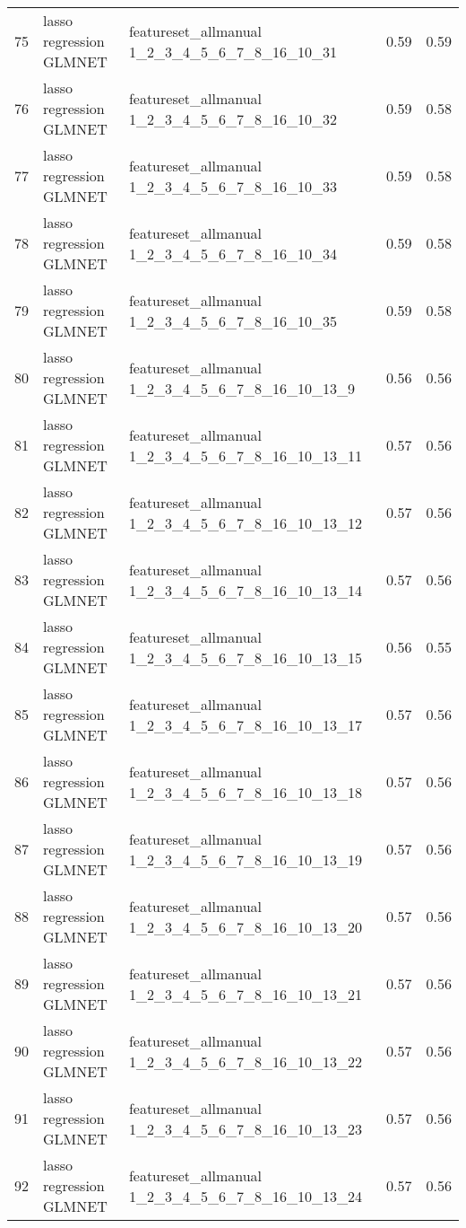 \begin{tabular}{cllcc}
  75 & lasso regression GLMNET & featureset\_allmanual 1\_2\_3\_4\_5\_6\_7\_8\_16\_10\_31 & 0.59 & 0.59 \\ 
  76 & lasso regression GLMNET & featureset\_allmanual 1\_2\_3\_4\_5\_6\_7\_8\_16\_10\_32 & 0.59 & 0.58 \\ 
  77 & lasso regression GLMNET & featureset\_allmanual 1\_2\_3\_4\_5\_6\_7\_8\_16\_10\_33 & 0.59 & 0.58 \\ 
  78 & lasso regression GLMNET & featureset\_allmanual 1\_2\_3\_4\_5\_6\_7\_8\_16\_10\_34 & 0.59 & 0.58 \\ 
  79 & lasso regression GLMNET & featureset\_allmanual 1\_2\_3\_4\_5\_6\_7\_8\_16\_10\_35 & 0.59 & 0.58 \\ 
  80 & lasso regression GLMNET & featureset\_allmanual 1\_2\_3\_4\_5\_6\_7\_8\_16\_10\_13\_9 & 0.56 & 0.56 \\ 
  81 & lasso regression GLMNET & featureset\_allmanual 1\_2\_3\_4\_5\_6\_7\_8\_16\_10\_13\_11 & 0.57 & 0.56 \\ 
  82 & lasso regression GLMNET & featureset\_allmanual 1\_2\_3\_4\_5\_6\_7\_8\_16\_10\_13\_12 & 0.57 & 0.56 \\ 
  83 & lasso regression GLMNET & featureset\_allmanual 1\_2\_3\_4\_5\_6\_7\_8\_16\_10\_13\_14 & 0.57 & 0.56 \\ 
  84 & lasso regression GLMNET & featureset\_allmanual 1\_2\_3\_4\_5\_6\_7\_8\_16\_10\_13\_15 & 0.56 & 0.55 \\ 
  85 & lasso regression GLMNET & featureset\_allmanual 1\_2\_3\_4\_5\_6\_7\_8\_16\_10\_13\_17 & 0.57 & 0.56 \\ 
  86 & lasso regression GLMNET & featureset\_allmanual 1\_2\_3\_4\_5\_6\_7\_8\_16\_10\_13\_18 & 0.57 & 0.56 \\ 
  87 & lasso regression GLMNET & featureset\_allmanual 1\_2\_3\_4\_5\_6\_7\_8\_16\_10\_13\_19 & 0.57 & 0.56 \\ 
  88 & lasso regression GLMNET & featureset\_allmanual 1\_2\_3\_4\_5\_6\_7\_8\_16\_10\_13\_20 & 0.57 & 0.56 \\ 
  89 & lasso regression GLMNET & featureset\_allmanual 1\_2\_3\_4\_5\_6\_7\_8\_16\_10\_13\_21 & 0.57 & 0.56 \\ 
  90 & lasso regression GLMNET & featureset\_allmanual 1\_2\_3\_4\_5\_6\_7\_8\_16\_10\_13\_22 & 0.57 & 0.56 \\ 
  91 & lasso regression GLMNET & featureset\_allmanual 1\_2\_3\_4\_5\_6\_7\_8\_16\_10\_13\_23 & 0.57 & 0.56 \\ 
  92 & lasso regression GLMNET & featureset\_allmanual 1\_2\_3\_4\_5\_6\_7\_8\_16\_10\_13\_24 & 0.57 & 0.56 \\ 

\end{tabular}
